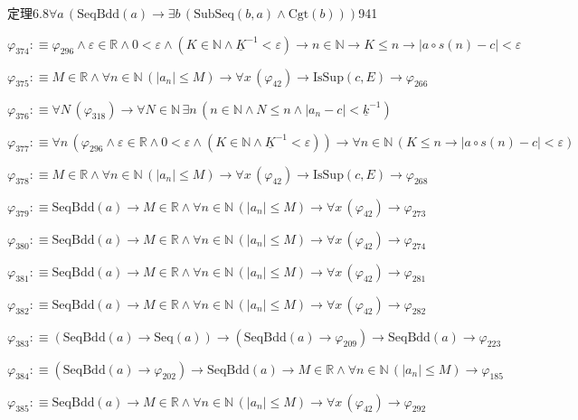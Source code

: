 \begin{fullproof}{定理6.8}{$\forall a\,(\mathrm{SeqBdd}(a) \to \exists b\,(\mathrm{SubSeq}(b,a) \land \mathrm{Cgt}(b)))$}{941}
\begin{abbrevlist}
\item $\varphi_{374} :\equiv \varphi_{296} \land \varepsilon \in \mathbb{R} \land 0 < \varepsilon \land (K \in \mathbb{N} \land \underline{K}^{-1} < \varepsilon) \to n \in \mathbb{N} \to K \leq n \to \lvert a \circ s(n) - c \rvert < \varepsilon$
\item $\varphi_{375} :\equiv M \in \mathbb{R} \land \forall n \in \mathbb{N}\,(\lvert a_{n} \rvert \leq M) \to \forall x\,(\varphi_{42}) \to \mathrm{IsSup}(c,E) \to \varphi_{266}$
\item $\varphi_{376} :\equiv \forall N\,(\varphi_{318}) \to \forall N \in \mathbb{N}\,\exists n\,(n \in \mathbb{N} \land N \leq n \land \lvert a_{n} - c \rvert < \underline{k}^{-1})$
\item $\varphi_{377} :\equiv \forall n\,(\varphi_{296} \land \varepsilon \in \mathbb{R} \land 0 < \varepsilon \land (K \in \mathbb{N} \land \underline{K}^{-1} < \varepsilon)) \to \forall n \in \mathbb{N}\,(K \leq n \to \lvert a \circ s(n) - c \rvert < \varepsilon)$
\item $\varphi_{378} :\equiv M \in \mathbb{R} \land \forall n \in \mathbb{N}\,(\lvert a_{n} \rvert \leq M) \to \forall x\,(\varphi_{42}) \to \mathrm{IsSup}(c,E) \to \varphi_{268}$
\item $\varphi_{379} :\equiv \mathrm{SeqBdd}(a) \to M \in \mathbb{R} \land \forall n \in \mathbb{N}\,(\lvert a_{n} \rvert \leq M) \to \forall x\,(\varphi_{42}) \to \varphi_{273}$
\item $\varphi_{380} :\equiv \mathrm{SeqBdd}(a) \to M \in \mathbb{R} \land \forall n \in \mathbb{N}\,(\lvert a_{n} \rvert \leq M) \to \forall x\,(\varphi_{42}) \to \varphi_{274}$
\item $\varphi_{381} :\equiv \mathrm{SeqBdd}(a) \to M \in \mathbb{R} \land \forall n \in \mathbb{N}\,(\lvert a_{n} \rvert \leq M) \to \forall x\,(\varphi_{42}) \to \varphi_{281}$
\item $\varphi_{382} :\equiv \mathrm{SeqBdd}(a) \to M \in \mathbb{R} \land \forall n \in \mathbb{N}\,(\lvert a_{n} \rvert \leq M) \to \forall x\,(\varphi_{42}) \to \varphi_{282}$
\item $\varphi_{383} :\equiv (\mathrm{SeqBdd}(a) \to \mathrm{Seq}(a)) \to (\mathrm{SeqBdd}(a) \to \varphi_{209}) \to \mathrm{SeqBdd}(a) \to \varphi_{223}$
\item $\varphi_{384} :\equiv (\mathrm{SeqBdd}(a) \to \varphi_{202}) \to \mathrm{SeqBdd}(a) \to M \in \mathbb{R} \land \forall n \in \mathbb{N}\,(\lvert a_{n} \rvert \leq M) \to \varphi_{185}$
\item $\varphi_{385} :\equiv \mathrm{SeqBdd}(a) \to M \in \mathbb{R} \land \forall n \in \mathbb{N}\,(\lvert a_{n} \rvert \leq M) \to \forall x\,(\varphi_{42}) \to \varphi_{292}$

\end{abbrevlist}
\end{fullproof}
